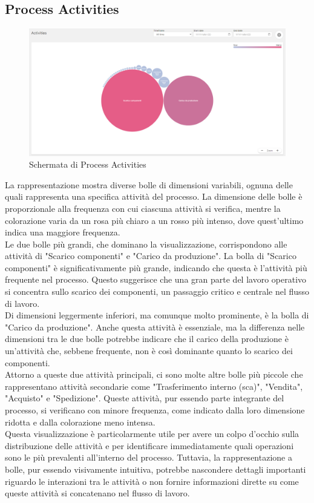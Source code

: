 \documentclass{article}
\begin{document}
\subsection{Process Activities}
\begin{figure}[H]
    \centering
    \includegraphics[width=\textwidth]{imgCelonis/DatiReali/ProcessActivities.png}
    \caption{Schermata di Process Activities}
    \label{fig:schermata-Process-Activities}
\end{figure}
La rappresentazione mostra diverse bolle di dimensioni variabili, ognuna delle quali rappresenta una specifica attività del processo. La dimensione delle bolle è proporzionale alla frequenza con cui ciascuna attività si verifica, mentre la colorazione varia da un rosa più chiaro a un rosso più intenso, dove quest'ultimo indica una maggiore frequenza.\\
Le due bolle più grandi, che dominano la visualizzazione, corrispondono alle attività di "Scarico componenti" e "Carico da produzione". La bolla di "Scarico componenti" è significativamente più grande, indicando che questa è l'attività più frequente nel processo. Questo suggerisce che una gran parte del lavoro operativo si concentra sullo scarico dei componenti, un passaggio critico e centrale nel flusso di lavoro.\\
Di dimensioni leggermente inferiori, ma comunque molto prominente, è la bolla di "Carico da produzione". Anche questa attività è essenziale, ma la differenza nelle dimensioni tra le due bolle potrebbe indicare che il carico della produzione è un'attività che, sebbene frequente, non è così dominante quanto lo scarico dei componenti.\\
Attorno a queste due attività principali, ci sono molte altre bolle più piccole che rappresentano attività secondarie come "Trasferimento interno (sca)", "Vendita", "Acquisto" e "Spedizione". Queste attività, pur essendo parte integrante del processo, si verificano con minore frequenza, come indicato dalla loro dimensione ridotta e dalla colorazione meno intensa.\\
Questa visualizzazione è particolarmente utile per avere un colpo d'occhio sulla distribuzione delle attività e per identificare immediatamente quali operazioni sono le più prevalenti all'interno del processo. Tuttavia, la rappresentazione a bolle, pur essendo visivamente intuitiva, potrebbe nascondere dettagli importanti riguardo le interazioni tra le attività o non fornire informazioni dirette su come queste attività si concatenano nel flusso di lavoro.
\end{document}
